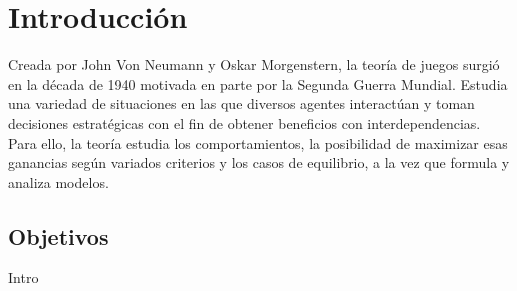 \chapter{Introducción} \label{cap:intro}

Creada por John Von Neumann y Oskar Morgenstern, la teoría de juegos surgió en la década de 1940 motivada en parte por la Segunda Guerra Mundial. Estudia una variedad de situaciones en las que diversos agentes interactúan y toman decisiones estratégicas con el fin de obtener beneficios con interdependencias. Para ello, la teoría estudia los comportamientos, la posibilidad de maximizar esas ganancias según variados criterios y los casos de equilibrio, a la vez que formula y analiza modelos.








\section{Objetivos} \label{cap:intro:sec:obj}

Intro 

